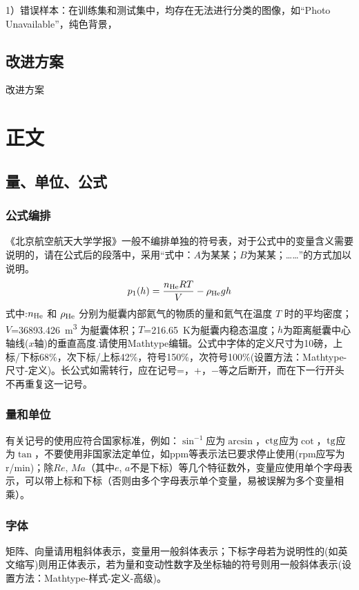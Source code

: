 \documentclass[10.5pt,twocolumn]{jbuaa}
\begin{document}
1）错误样本：在训练集和测试集中，均存在无法进行分类的图像，如“Photo Unavailable”，纯色背景，
\subsection{改进方案}
改进方案

\section{正文}
\subsection{量、单位、公式}
\subsubsection{公式编排}
\label{labSecForm}
《北京航空航天大学学报》一般不编排单独的符号表，对于公式中的变量含义需要说明的，请在公式后的段落中，采用“式中：$A$为某某；$B$为某某；……”的方式加以说明。
\begin{equation}
\label{eqnLabelp}
p_1 (h) = \dfrac{n_{\textnormal{He}}RT}{V}-\rho_{\textnormal{He}}gh
\end{equation}
式中:$n_{\textnormal{He}}$ 和 $\rho_{\textnormal{He}}$ 分别为艇囊内部氦气的物质的量和氦气在温度 $T$ 时的平均密度；
$V$=\SI{36893.426}{\cubic\meter}%
为艇囊体积；$T$=\SI{216.65}{\kelvin}为艇囊内稳态温度；$h$为距离艇囊中心轴线($x$轴)的垂直高度.请使用Mathtype编辑。公式中字体的定义尺寸为10磅，上标/下标68\%，次下标/上标42\%，符号150\%，次符号100\%(设置方法：Mathtype-尺寸-定义)。长公式如需转行，应在记号=，+，$-$等之后断开，而在下一行开头不再重复这一记号。

\subsubsection{量和单位}
有关记号的使用应符合国家标准，例如：$\sin^{-1}$应为$\arcsin$，$\rm ctg$应为$\cot$，$\rm tg$应为$\tan$，不要使用非国家法定单位，如ppm等表示法已要求停止使用(rpm应写为r/min)；除$Re$, $Ma$（其中$e$, $a$不是下标）等几个特征数外，变量应使用单个字母表示，可以带上标和下标（否则由多个字母表示单个变量，易被误解为多个变量相乘）。

\subsubsection{字体}
矩阵、向量请用粗斜体表示，变量用一般斜体表示；下标字母若为说明性的(如英文缩写)则用正体表示，若为量和变动性数字及坐标轴的符号则用一般斜体表示(设置方法：Mathtype-样式-定义-高级)。
\end{document}
